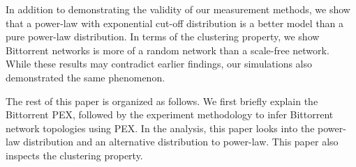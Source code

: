 \documentclass[10pt,conference,letterpaper,final]{IEEEtran}
\begin{document}

In addition to demonstrating the validity of our measurement methods, we show that a power-law with exponential cut-off distribution is a better model than a pure power-law distribution. 
In terms of the clustering property, we show Bittorrent networks is more of a random network than a scale-free network. 
While these results may contradict earlier findings, our simulations also demonstrated the same phenomenon.

The rest of this paper is organized as follows. We first briefly explain the Bittorrent PEX, followed by the experiment methodology to infer Bittorrent network topologies using PEX. 
In the analysis, this paper looks into the power-law distribution and an alternative distribution to power-law. 
This paper also inspects the clustering property.

\end{document}
